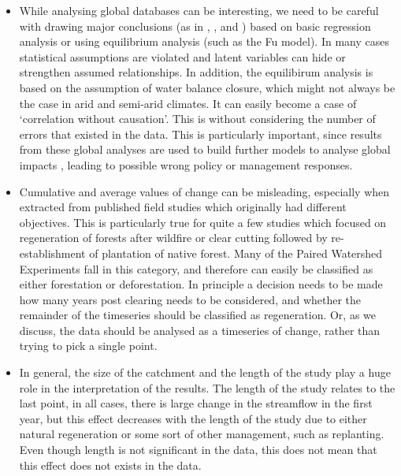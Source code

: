\documentclass[]{elsarticle} %
\providecommand{\tightlist}{%
  \setlength{\itemsep}{0pt}\setlength{\parskip}{0pt}}
\begin{document}
\begin{itemize}
\tightlist
\item
  While analysing global databases can be interesting, we need to be careful with drawing major conclusions (as in \citet{zhang2017}, \citet{filoso2017}, \citet{zhou2015} and \citet{jackson2005}) based on basic regression analysis or using equilibrium analysis (such as the Fu model). In many cases statistical assumptions are violated and latent variables can hide or strengthen assumed relationships. In addition, the equilibirum analysis is based on the assumption of water balance closure, which might not always be the case in arid and semi-arid climates. It can easily become a case of `correlation without causation'. This is without considering the number of errors that existed in the data. This is particularly important, since results from these global analyses are used to build further models to analyse global impacts \citep[e.g.][]{hoekvandijke2022}, leading to possible wrong policy or management responses.
\item
  Cumulative and average values of change can be misleading, especially when extracted from published field studies which originally had different objectives. This is particularly true for quite a few studies which focused on regeneration of forests after wildfire or clear cutting followed by re-establishment of plantation of native forest. Many of the Paired Watershed Experiments \citep[e.g.][]{cornish2001, webb2009, webb2012, webb2013, watson2001} fall in this category, and therefore can easily be classified as either forestation or deforestation. In principle a decision needs to be made how many years post clearing needs to be considered, and whether the remainder of the timeseries should be classified as regeneration. Or, as we discuss, the data should be analysed as a timeseries of change, rather than trying to pick a single point.
\item
  In general, the size of the catchment and the length of the study play a huge role in the interpretation of the results. The length of the study relates to the last point, in all cases, there is large change in the streamflow in the first year, but this effect decreases with the length of the study due to either natural regeneration or some sort of other management, such as replanting. Even though length is not significant in the data, this does not mean that this effect does not exists in the data.

\end{itemize}
\end{document}
